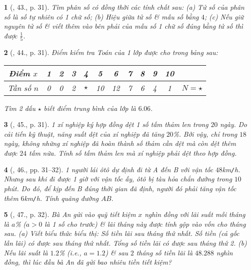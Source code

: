 \documentclass{article}
\newtheorem{baitoan}{}
\begin{document}
\begin{baitoan}[\cite{SGK_Toan_8_tap_2}, 43., p. 31]
	Tìm phân số có đồng thời các tính chất sau: (a) Tử số của phân số là số tự nhiên có 1 chữ số; (b) Hiệu giữa tử số \& mẫu số bằng $4$; (c) Nếu giữ nguyên tử số \& viết thêm vào bên phải của mẫu số 1 chữ số đúng bằng tử số thì được $\frac{1}{5}$.
\end{baitoan}

\begin{baitoan}[\cite{SGK_Toan_8_tap_2}, 44., p. 31]
	Điểm kiểm tra Toán của 1 lớp được cho trong bảng sau:
	\begin{table}[H]
		\centering
		\begin{tabular}{|c|c|c|c|c|c|c|c|c|c|c|c|}
			\hline
			Điểm $x$ & 1 & 2 & 3 & 4 & 5 & 6 & 7 & 8 & 9 & 10 &  \\
			\hline
			Tần số $n$ & 0 & 0 & 2 & $\star$ & 10 & 12 & 7 & 6 & 4 & 1 & $N = \star$ \\
			\hline
		\end{tabular}
	\end{table}
	Tìm 2 dấu $\star$ biết điểm trung bình của lớp là $6.06$.
\end{baitoan}

\begin{baitoan}[\cite{SGK_Toan_8_tap_2}, 45., p. 31]
	1 xí nghiệp ký hợp đồng dệt 1 số tấm thảm len trong $20$ ngày. Do cải tiến kỹ thuật, năng suất dệt của xí nghiệp đã tăng $20$\%. Bởi vậy, chỉ trong $18$ ngày, không những xí nghiệp đã hoàn thành số thảm cần dệt mà còn dệt thêm được $24$ tấm nữa. Tính số tấm thảm len mà xí nghiệp phải dệt theo hợp đồng.
\end{baitoan}

\begin{baitoan}[\cite{SGK_Toan_8_tap_2}, 46., pp. 31--32]
	1 người lái ôtô dự định đi từ A đến B với vận tốc $48$\emph{km\texttt{/}h}. Nhưng sau khi đi được 1 giờ với vận tốc ấy, ôtô bị tàu hỏa chắn đường trong $10$ phút. Do đó, để kịp đến B đúng thời gian đã định, người đó phải tăng vận tốc thêm $6$\emph{km\texttt{/}h}. Tính quãng đường $AB$.
\end{baitoan}

\begin{baitoan}[\cite{SGK_Toan_8_tap_2}, 47., p. 32]
	Bà An gửi vào quỹ tiết kiệm $x$ nghìn đồng với lãi suất mỗi tháng là $a$\% ($a > 0$ là 1 số cho trước) \& lãi tháng này được tính gộp vào vốn cho tháng sau. (a) Viết biểu thức biểu thị: Số tiền lãi sau tháng thứ nhất. Số tiền (cả gốc lẫn lãi) có được sau tháng thứ nhất. Tổng số tiền lãi có được sau tháng thứ 2. (b) Nếu lãi suất là $1.2$\% (i.e., $a = 1.2$) \& sau $2$ tháng số tiền lãi là $48.288$ nghìn đồng, thì lúc đầu bà An đã gửi bao nhiêu tiền tiết kiệm?
\end{baitoan}
\end{document}
